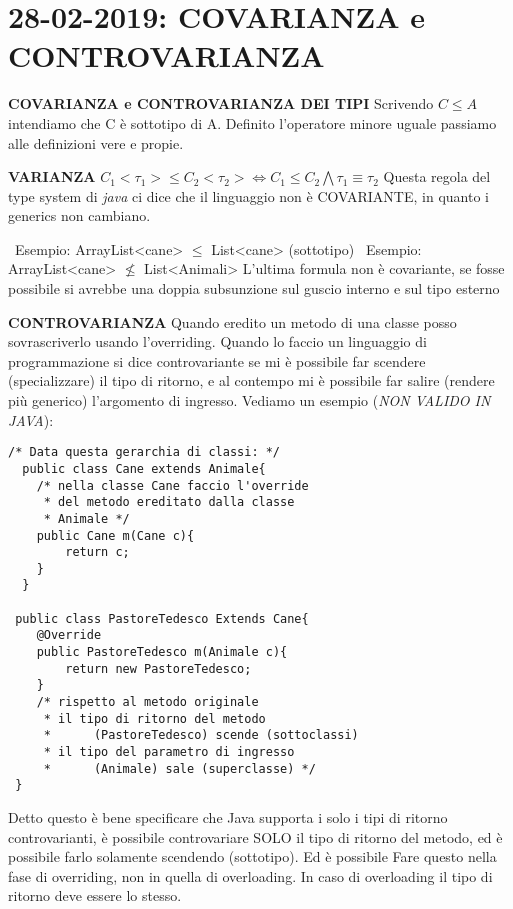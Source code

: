 

\newpage
\section{28-02-2019: COVARIANZA e CONTROVARIANZA}
\textbf{COVARIANZA e CONTROVARIANZA DEI TIPI }\newline
Scrivendo  $C \leq A$ intendiamo che C è sottotipo di A. Definito l'operatore minore uguale passiamo alle definizioni vere e propie.

\noindent \textbf{VARIANZA} \newline
$C_{1} <\tau_{1}> \leq C_{2}<\tau_{2}> \Leftrightarrow C_{1} \leq C_{2} \bigwedge \tau_{1}\equiv \tau_{2} $
\newline
Questa regola del type system di \textit{java} ci dice che il linguaggio non è COVARIANTE, in quanto i generics non cambiano. 

\noindent \textbullet\ Esempio: ArrayList<cane> $\leq$ List<cane> (sottotipo) \newline
\textbullet\ Esempio: ArrayList<cane> $\nleq$ List<Animali> \newline
L'ultima formula non è covariante, se fosse possibile si avrebbe una doppia subsunzione sul guscio interno e sul tipo esterno \newline

\noindent \textbf{CONTROVARIANZA} \newline
Quando eredito un metodo di una classe posso sovrascriverlo usando l'overriding. Quando lo faccio un linguaggio di programmazione si dice controvariante se mi è possibile far scendere (specializzare) il tipo di ritorno, e al contempo mi è possibile far salire (rendere più generico) l'argomento di ingresso. Vediamo un esempio (\textit{NON VALIDO IN JAVA}):
\begin{lstlisting}[basicstyle=\small,]
/* Data questa gerarchia di classi: */
  public class Cane extends Animale{
	/* nella classe Cane faccio l'override
 	 * del metodo ereditato dalla classe
 	 * Animale */  
	public Cane m(Cane c){
		return c;
	}
  }
  
 public class PastoreTedesco Extends Cane{
 	@Override
	public PastoreTedesco m(Animale c){
		return new PastoreTedesco;
	}
	/* rispetto al metodo originale
	 * il tipo di ritorno del metodo 
	 *		(PastoreTedesco) scende (sottoclassi)
 	 * il tipo del parametro di ingresso 
 	 * 		(Animale) sale (superclasse) */	
 }
\end{lstlisting}

\noindent Detto questo è bene specificare che Java supporta i solo i tipi di ritorno controvarianti, è possibile controvariare SOLO il tipo di ritorno del metodo, ed è possibile farlo solamente scendendo (sottotipo). Ed è possibile Fare questo nella fase di overriding, non in quella di overloading. In caso di overloading il tipo di ritorno deve essere lo stesso.

